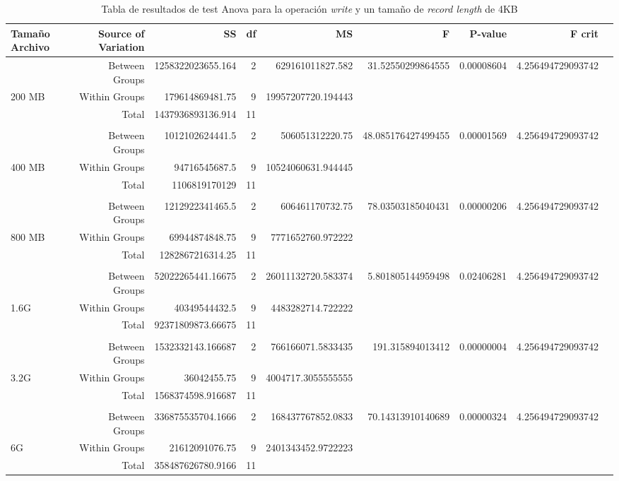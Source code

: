 \begin{landscape}


\begin{table}[!htp]\centering
\caption{Tabla de resultados de test Anova para la operación \textit{write} y un tamaño de \textit{record length} de 4KB}\label{tab: }
\scriptsize
\begin{tabular}{lrrrrrrrr}\toprule
Tamaño Archivo &Source of Variation &SS &df &MS &F &P-value &F crit \\\midrule
&Between Groups &1258322023655.164 &2 &629161011827.582 &31.52550299864555 &0.00008604 &4.256494729093742 \\
200 MB &Within Groups &179614869481.75 &9 &19957207720.194443 & & & \\
&Total &1437936893136.914 &11 & & & & \\
& & & & & & & \\
&Between Groups &1012102624441.5 &2 &506051312220.75 &48.085176427499455 &0.00001569 &4.256494729093742 \\
400 MB &Within Groups &94716545687.5 &9 &10524060631.944445 & & & \\
&Total &1106819170129 &11 & & & & \\
& & & & & & & \\
&Between Groups &1212922341465.5 &2 &606461170732.75 &78.03503185040431 &0.00000206 &4.256494729093742 \\
800 MB &Within Groups &69944874848.75 &9 &7771652760.972222 & & & \\
&Total &1282867216314.25 &11 & & & & \\
& & & & & & & \\
&Between Groups &52022265441.16675 &2 &26011132720.583374 &5.801805144959498 &0.02406281 &4.256494729093742 \\
1.6G &Within Groups &40349544432.5 &9 &4483282714.722222 & & & \\
&Total &92371809873.66675 &11 & & & & \\
& & & & & & & \\
&Between Groups &1532332143.166687 &2 &766166071.5833435 &191.315894013412 &0.00000004 &4.256494729093742 \\
3.2G &Within Groups &36042455.75 &9 &4004717.3055555555 & & & \\
&Total &1568374598.916687 &11 & & & & \\
& & & & & & & \\
&Between Groups &336875535704.1666 &2 &168437767852.0833 &70.14313910140689 &0.00000324 &4.256494729093742 \\
6G &Within Groups &21612091076.75 &9 &2401343452.9722223 & & & \\
&Total &358487626780.9166 &11 & & & & \\
\bottomrule
\end{tabular}
\end{table}

\end{landscape}

